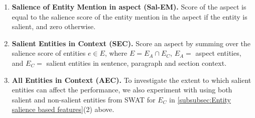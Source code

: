 \begin{enumerate}
    \item \textbf{Salience of Entity Mention in aspect (Sal-EM).} Score of the aspect is equal to the salience score of the entity mention in the aspect if the entity is salient, and zero otherwise.
    
    \item \textbf{Salient Entities in Context (SEC).} Score an aspect by summing over the salience score of entities $e \in E$, where $E = E_A \cap E_C$, $E_A =$ aspect entities, and $E_C =$ salient entities in sentence, paragraph and section context.
    
    
    \item \textbf{All Entities in Context (AEC).} 
    To investigate the extent to which salient entities can affect the performance, we also experiment with using both salient and non-salient entities from SWAT for $E_C$ in \ref{subsubsec:Entity salience based features}(2) above. 
\end{enumerate}



